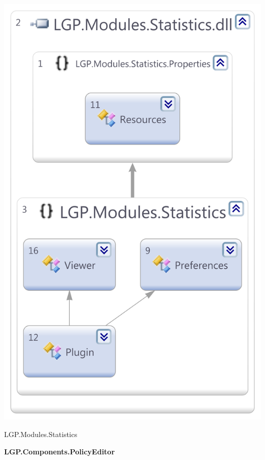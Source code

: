 		\begin{figurehere}
			\centering
			\includegraphics[scale=0.40]{pages/appendix3/figures/dllscreens/stats.png}
			\caption{LGP.Modules.Statistics}
		\end{figurehere}
		
		
\newpage
			
	
	\large{\bfseries{LGP.Components.PolicyEditor}}
	\vspace{5mm}
	
